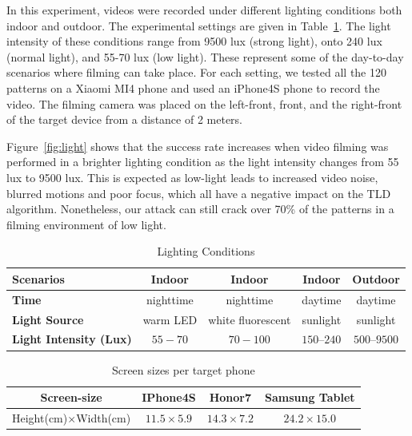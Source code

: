    In this experiment, videos were recorded under different lighting conditions both indoor and outdoor.
    The experimental settings are given in  Table~\ref{tab:light}.
    The light intensity of these conditions range from 9500
    lux (strong light), onto 240 lux (normal light), and 55-70 lux (low light).
    These represent some of the day-to-day scenarios where filming can
    take place. For each setting, we tested all the 120 patterns on a Xiaomi MI4 phone and used
    an iPhone4S phone to record the video. The filming camera was placed on the
    left-front, front, and the right-front of the target device from a distance
    of 2 meters.


    Figure~\ref{fig:light} shows that the success rate increases when video filming was performed in a brighter lighting condition as the light intensity
    changes from 55 lux to 9500 lux. This is expected as low-light leads to
    increased video noise, blurred motions and poor focus, which all have a
    negative impact on the TLD algorithm. Nonetheless, our attack
    can still crack over 70\% of the patterns in a filming
    environment of low light.

       \begin{table}[!t]
            \centering
            \caption{Lighting Conditions}
            \label{tab:light}
            \scriptsize
            \begin{tabular}{lcccc}
                \toprule
                \textbf{Scenarios} & Indoor  & Indoor & Indoor  & Outdoor\\
                \midrule
                \textbf{Time} & nighttime &  nighttime & daytime & daytime \\
                \textbf{Light Source}& warm LED & white fluorescent & sunlight &  sunlight \\
                \textbf{Light Intensity (Lux)} & $55-70$ & $70-100$ & $150$--$240$ & $500$--$9500$ \\
                \bottomrule
            \end{tabular}
        \end{table}


    \begin{table}[!t]
            \centering
            \caption{Screen sizes per target phone}
            \label{tab:screen-size}
            \scriptsize
            \begin{tabular}{cccc}
                \toprule
                \textbf{Screen-size}& \textbf{IPhone4S }& \textbf{Honor7} & \textbf{Samsung Tablet} \\
                \midrule
                Height(cm)$\times$Width(cm) & $11.5\times5.9$ & $14.3\times7.2$ & $24.2\times15.0$ \\
                \bottomrule
            \end{tabular}
    \end{table}

